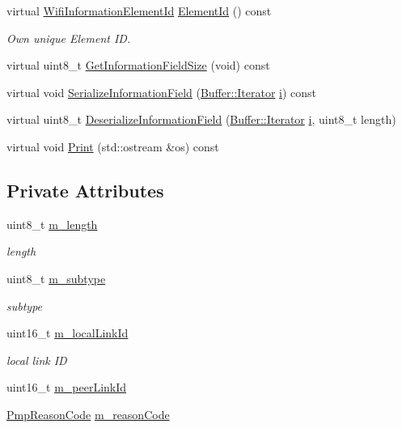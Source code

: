 \begin{DoxyCompactItemize}
\item 
virtual \hyperlink{namespacens3_aeb185e0c8a60816016bca079f1420478}{Wifi\+Information\+Element\+Id} \hyperlink{classns3_1_1dot11s_1_1IePeerManagement_a82b1c04d195485353b08e1e7197d365c}{Element\+Id} () const 
\begin{DoxyCompactList}\small\item\em Own unique Element ID. \end{DoxyCompactList}\item 
virtual uint8\+\_\+t \hyperlink{classns3_1_1dot11s_1_1IePeerManagement_a581d0f9fd09f60d12300e24840dd9004}{Get\+Information\+Field\+Size} (void) const 
\item 
virtual void \hyperlink{classns3_1_1dot11s_1_1IePeerManagement_a32e95e044d5eb1b54c15845b48009730}{Serialize\+Information\+Field} (\hyperlink{classns3_1_1Buffer_1_1Iterator}{Buffer\+::\+Iterator} \hyperlink{lte__uplink__power__control_8m_a6f6ccfcf58b31cb6412107d9d5281426}{i}) const 
\item 
virtual uint8\+\_\+t \hyperlink{classns3_1_1dot11s_1_1IePeerManagement_a6748d7d322a37a1ec741f9f0fa3134a0}{Deserialize\+Information\+Field} (\hyperlink{classns3_1_1Buffer_1_1Iterator}{Buffer\+::\+Iterator} \hyperlink{lte__uplink__power__control_8m_a6f6ccfcf58b31cb6412107d9d5281426}{i}, uint8\+\_\+t length)
\item 
virtual void \hyperlink{classns3_1_1dot11s_1_1IePeerManagement_a6046ac97b0245af265bb84a7be1e86f3}{Print} (std\+::ostream \&os) const 
\end{DoxyCompactItemize}
\subsection*{Private Attributes}
\begin{DoxyCompactItemize}
\item 
uint8\+\_\+t \hyperlink{classns3_1_1dot11s_1_1IePeerManagement_a89cc953d3b8c1108b93ea84dd92284f6}{m\+\_\+length}
\begin{DoxyCompactList}\small\item\em length \end{DoxyCompactList}\item 
uint8\+\_\+t \hyperlink{classns3_1_1dot11s_1_1IePeerManagement_a6be443bb9cc6571e76ea6c44084ffdda}{m\+\_\+subtype}
\begin{DoxyCompactList}\small\item\em subtype \end{DoxyCompactList}\item 
uint16\+\_\+t \hyperlink{classns3_1_1dot11s_1_1IePeerManagement_a58bbcf702c3ef0d34cfbc3a8316c39fe}{m\+\_\+local\+Link\+Id}
\begin{DoxyCompactList}\small\item\em local link ID \end{DoxyCompactList}\item 
uint16\+\_\+t \hyperlink{classns3_1_1dot11s_1_1IePeerManagement_a07c9966d359b67f3f96dd950d292c280}{m\+\_\+peer\+Link\+Id}
\item 
\hyperlink{group__dot11s_ga1132ec5975c87960ceb86ea54481aba6}{Pmp\+Reason\+Code} \hyperlink{classns3_1_1dot11s_1_1IePeerManagement_a4c317afac49a324076aa14e0dd65ac31}{m\+\_\+reason\+Code}
\end{DoxyCompactItemize}
